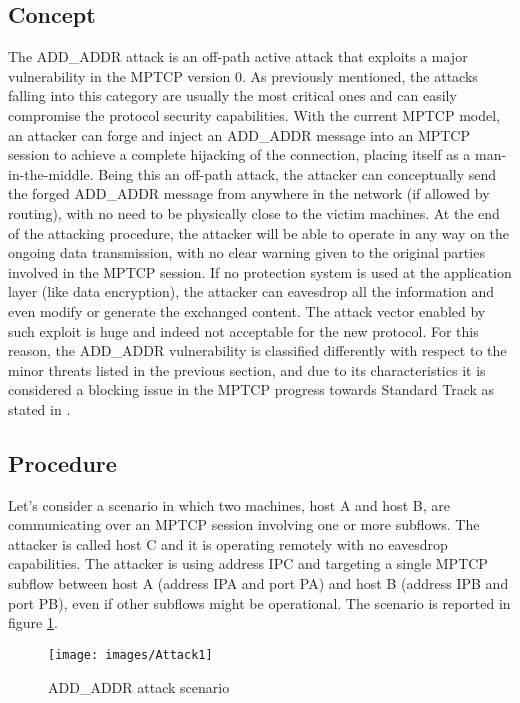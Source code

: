 \subsection{Concept}
The ADD\_ADDR attack is an off-path active attack that exploits a major vulnerability in the MPTCP version 0. As previously mentioned, the attacks falling into this category are usually the most critical ones and can easily compromise the protocol security capabilities.
With the current MPTCP model, an attacker can forge and inject an ADD\_ADDR message into an MPTCP session to achieve a complete hijacking of the connection, placing itself as a man-in-the-middle. Being this an off-path attack, the attacker can conceptually send the forged ADD\_ADDR message from anywhere in the network (if allowed by routing), with no need to be physically close to the victim machines. At the end of the attacking procedure, the attacker will be able to operate in any way on the ongoing data transmission, with no clear warning given to the original parties involved in the MPTCP session.
If no protection system is used at the application layer (like data encryption), the attacker can eavesdrop all the information and even modify or generate the exchanged content. The attack vector enabled by such exploit is huge and indeed not acceptable for the new protocol. For this reason, the ADD\_ADDR vulnerability is classified differently with respect to the minor threats listed in the previous section, and due to its characteristics it is considered a blocking issue in the MPTCP progress towards Standard Track as stated in .

\subsection{Procedure}
Let's consider a scenario in which two machines, host A and host B, are communicating over an MPTCP session involving one or more subflows. The attacker is called host C and it is operating remotely with no eavesdrop capabilities. The attacker is using address IPC and targeting a single MPTCP subflow between host A (address IPA and port PA) and host B (address IPB and port PB), even if other subflows might be operational. The scenario is reported in figure \ref{fig:attack1}.

\begin{figure}[!htb]
\centering
\texttt{[image: images/Attack1]}
\caption{ADD\_ADDR attack scenario}
\label{fig:attack1}
\end{figure}

